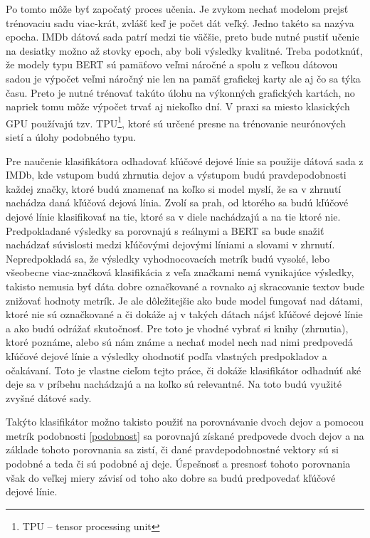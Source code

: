 Po tomto môže byť započatý proces učenia. Je zvykom nechať modelom prejsť trénovaciu sadu viac-krát, zvlášť keď je počet dát veľký. Jedno takéto  sa nazýva epocha. IMDb dátová sada patrí medzi tie väčšie, preto bude nutné pustiť učenie na desiatky možno až stovky epoch, aby boli výsledky kvalitné. Treba podotknúť, že modely typu BERT sú pamäťovo veľmi náročné a spolu z veľkou dátovou sadou je výpočet veľmi náročný nie len na pamäť grafickej karty ale aj čo sa týka času. Preto je nutné trénovať takúto úlohu na výkonných grafických kartách, no napriek tomu môže výpočet trvať aj niekoľko dní. V praxi sa miesto klasických GPU používajú tzv. TPU\footnote{TPU -- tensor processing unit}, ktoré sú určené presne na trénovanie neurónových sietí a úlohy podobného typu. 

Pre naučenie klasifikátora odhadovať kľúčové dejové línie sa použije dátová sada z IMDb, kde vstupom budú zhrnutia dejov a výstupom budú pravdepodobnosti každej značky, ktoré budú znamenať na koľko si model myslí, že sa v zhrnutí nachádza daná kľúčová dejová línia. Zvolí sa prah, od ktorého sa budú kľúčové dejové línie klasifikovať na tie, ktoré sa v diele nachádzajú a na tie ktoré nie. Predpokladané výsledky sa porovnajú s reálnymi a BERT sa bude snažiť nachádzať súvislosti medzi kľúčovými dejovými líniami a slovami v zhrnutí. Nepredpokladá sa, že výsledky vyhodnocovacích metrík budú vysoké, lebo všeobecne viac-značková klasifikácia z veľa značkami nemá vynikajúce výsledky, takisto nemusia byť dáta dobre označkované a rovnako aj skracovanie textov bude znižovať hodnoty metrík. Je ale dôležitejšie ako bude model fungovať nad dátami, ktoré nie sú označkované a či dokáže aj v takých dátach nájsť kľúčové dejové línie a ako budú odrážať skutočnosť. Pre toto je vhodné vybrať si knihy (zhrnutia), ktoré poznáme, alebo sú nám známe a nechať model nech nad nimi predpovedá kľúčové dejové línie a výsledky ohodnotiť podľa vlastných predpokladov a očakávaní. Toto je vlastne cieľom tejto práce, či dokáže klasifikátor odhadnúť aké deje sa v príbehu nachádzajú a na koľko sú relevantné. Na toto budú využité zvyšné dátové sady.

Takýto klasifikátor možno takisto použiť na porovnávanie dvoch dejov a pomocou metrík podobnosti \ref{podobnost} sa porovnajú získané predpovede dvoch dejov a na základe tohoto porovnania sa zistí, či dané pravdepodobnostné vektory sú si podobné a teda či sú podobné aj deje. Úspešnosť a presnosť tohoto porovnania však do veľkej miery závisí od toho ako dobre sa budú predpovedať kľúčové dejové línie.

